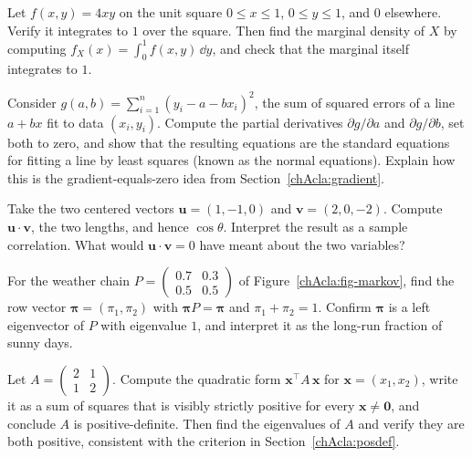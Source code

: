 \begin{exercise}
\label{chAcla:exr-marginal}
Let $f(x,y)=4xy$ on the unit square $0\le x\le 1$, $0\le y\le 1$, and $0$ elsewhere. Verify it
integrates to $1$ over the square. Then find the marginal density of $X$ by computing
$f_X(x)=\int_0^1 f(x,y)\,\dd y$, and check that the marginal itself integrates to $1$.
\end{exercise}

\begin{exercise}
\label{chAcla:exr-gradient}
Consider $g(a,b)=\sum_{i=1}^n (y_i - a - b x_i)^2$, the sum of squared errors of a line $a+bx$ fit to
data $(x_i,y_i)$. Compute the partial derivatives $\partial g/\partial a$ and $\partial g/\partial b$,
set both to zero, and show that the resulting equations are the standard equations for fitting a line by least squares (known as the normal equations).
Explain how this is the gradient-equals-zero idea from Section~\ref{chAcla:gradient}.
\end{exercise}

\begin{exercise}
\label{chAcla:exr-cosine}
Take the two centered vectors $\mathbf{u}=(1,-1,0)$ and $\mathbf{v}=(2,0,-2)$. Compute
$\mathbf{u}\cdot\mathbf{v}$, the two lengths, and hence $\cos\theta$. Interpret the result as a
sample correlation. What would $\mathbf{u}\cdot\mathbf{v}=0$ have meant about the two variables?
\end{exercise}

\begin{exercise}
\label{chAcla:exr-eigen}
For the weather chain $P=\left(\begin{smallmatrix} 0.7 & 0.3 \\ 0.5 & 0.5 \end{smallmatrix}\right)$
of Figure~\ref{chAcla:fig-markov}, find the row vector $\boldsymbol\pi=(\pi_1,\pi_2)$ with
$\boldsymbol\pi P=\boldsymbol\pi$ and $\pi_1+\pi_2=1$. Confirm $\boldsymbol\pi$ is a left eigenvector
of $P$ with eigenvalue $1$, and interpret it as the long-run fraction of sunny days.
\end{exercise}

\begin{exercise}
\label{chAcla:exr-posdef}
Let $A=\begin{pmatrix} 2 & 1 \\ 1 & 2 \end{pmatrix}$. Compute the quadratic form
$\mathbf{x}^\top A\,\mathbf{x}$ for $\mathbf{x}=(x_1,x_2)$, write it as a sum of squares that is visibly
strictly positive for every $\mathbf{x} \ne \mathbf{0}$, and conclude $A$ is positive-definite. Then find the eigenvalues of $A$ and verify they
are both positive, consistent with the criterion in Section~\ref{chAcla:posdef}.
\end{exercise}

